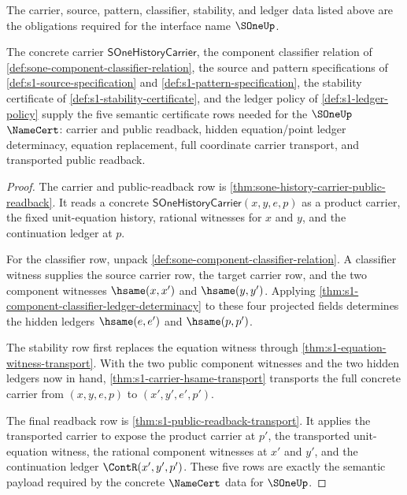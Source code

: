 \begin{definition}
\label{def:s1-certificate-obligations}
The carrier, source, pattern, classifier, stability, and ledger data listed above are the obligations required for the interface name $\SOneUp$.
\end{definition}

\begin{theorem}
\label{thm:sone-semantic-namecert-field-assembly}
The concrete carrier $\mathsf{SOneHistoryCarrier}$, the component classifier
relation of \autoref{def:sone-component-classifier-relation}, the source and
pattern specifications of \autoref{def:s1-source-specification} and
\autoref{def:s1-pattern-specification}, the stability certificate of
\autoref{def:s1-stability-certificate}, and the ledger policy of
\autoref{def:s1-ledger-policy} supply the five semantic certificate rows needed
for the $\SOneUp$ $\NameCert$: carrier and public readback, hidden
equation/point ledger determinacy, equation replacement, full coordinate
carrier transport, and transported public readback.
\end{theorem}
\begin{proof}
The carrier and public-readback row is
\autoref{thm:sone-history-carrier-public-readback}. It reads a concrete
$\mathsf{SOneHistoryCarrier}(x,y,e,p)$ as a product carrier, the fixed
unit-equation history, rational witnesses for $x$ and $y$, and the continuation
ledger at $p$.

For the classifier row, unpack
\autoref{def:sone-component-classifier-relation}. A classifier witness supplies
the source carrier row, the target carrier row, and the two component witnesses
$\hsame(x,x')$ and $\hsame(y,y')$. Applying
\autoref{thm:s1-component-classifier-ledger-determinacy} to these four projected
fields determines the hidden ledgers $\hsame(e,e')$ and $\hsame(p,p')$.

The stability row first replaces the equation witness through
\autoref{thm:s1-equation-witness-transport}. With the two public component
witnesses and the two hidden ledgers now in hand,
\autoref{thm:s1-carrier-hsame-transport} transports the full concrete carrier
from $(x,y,e,p)$ to $(x',y',e',p')$.

The final readback row is
\autoref{thm:s1-public-readback-transport}. It applies the transported carrier
to expose the product carrier at $p'$, the transported unit-equation witness,
the rational component witnesses at $x'$ and $y'$, and the continuation ledger
$\ContR(x',y',p')$. These five rows are exactly the semantic payload required by
the concrete $\NameCert$ data for $\SOneUp$.
\end{proof}

